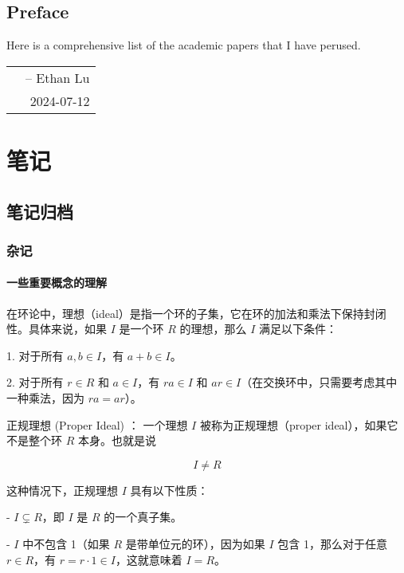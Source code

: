 \documentclass[lang=cn,12pt,a4paper,fontset=none]{beautybook}
\begin{document}
\frontmatter
{}

{%
\thispagestyle{empty}
\chapter*{Preface}
Here is a comprehensive list of the academic papers that I have perused.


\hfill
\begin{tabular}{lr}
    &-- Ethan Lu\\ 
    &2024-07-12
\end{tabular}
\clearpage}

\thispagestyle{empty}
\tableofcontents\let\cleardoublepage\clearpage


\mainmatter
{}

\part{笔记}
\chapter{笔记归档}
\section{杂记}
\subsection{一些重要概念的理解}
   在环论中，理想（ideal）是指一个环的子集，它在环的加法和乘法下保持封闭性。具体来说，如果 $I$ 是一个环 $R$ 的理想，那么 $I$ 满足以下条件：

1. 对于所有 $a, b \in I$，有 $a + b \in I$。

2. 对于所有 $r \in R$ 和 $a \in I$，有 $ra \in I$ 和 $ar \in I$（在交换环中，只需要考虑其中一种乘法，因为 $ra = ar$）。

正规理想 (Proper Ideal) ：
一个理想 $I$ 被称为正规理想（proper ideal），如果它不是整个环 $R$ 本身。也就是说 %

\[ I \neq R \]

这种情况下，正规理想 $I$ 具有以下性质：

- $I \subsetneq R$，即 $I$ 是 $R$ 的一个真子集。

- $I$ 中不包含 1（如果 $R$ 是带单位元的环），因为如果 $I$ 包含 1，那么对于任意 $r \in R$，有 $r = r \cdot 1 \in I$，这就意味着 $I = R$。
\end{document}
